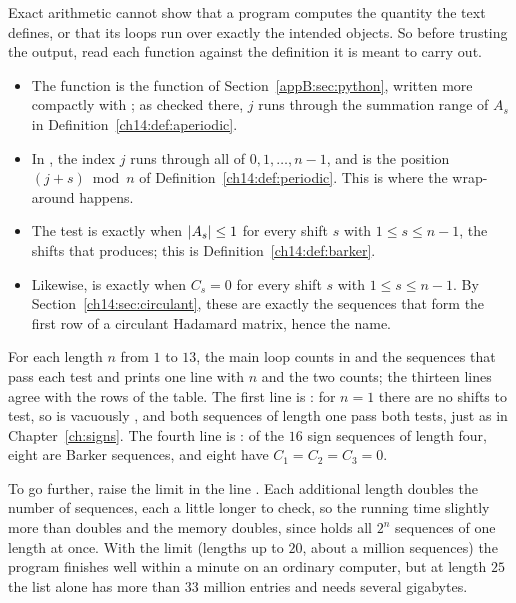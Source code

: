Exact arithmetic cannot show that a program computes the quantity the text defines, or that its loops run over exactly the intended objects. So before trusting the output, read each function against the definition it is meant to carry out.
\begin{itemize}
\item The function  is the function  of Section~\ref{appB:sec:python}, written more compactly with ; as checked there, $j$ runs through the summation range of $A_s$ in Definition~\ref{ch14:def:aperiodic}.
\item In , the index $j$ runs through all of $0,1,\ldots,n-1$, and  is the position $(j+s)\bmod n$ of Definition~\ref{ch14:def:periodic}. This is where the wrap-around happens.
\item The test  is  exactly when $\left|A_s\right|\le1$ for every shift $s$ with $1\le s\le n-1$, the shifts that  produces; this is Definition~\ref{ch14:def:barker}.
\item Likewise,  is  exactly when $C_s=0$ for every shift $s$ with $1\le s\le n-1$. By Section~\ref{ch14:sec:circulant}, these are exactly the sequences that form the first row of a circulant Hadamard matrix, hence the name.
\end{itemize}
For each length $n$ from $1$ to $13$, the main loop counts in  and  the sequences that pass each test and prints one line with $n$ and the two counts; the thirteen lines agree with the rows of the table. The first line is : for $n=1$ there are no shifts to test, so  is vacuously , and both sequences of length one pass both tests, just as in Chapter~\ref{ch:signs}. The fourth line is : of the $16$ sign sequences of length four, eight are Barker sequences, and eight have $C_1=C_2=C_3=0$.

To go further, raise the limit  in the line . Each additional length doubles the number of sequences, each a little longer to check, so the running time slightly more than doubles and the memory doubles, since  holds all $2^n$ sequences of one length at once. With the limit  (lengths up to $20$, about a million sequences) the program finishes well within a minute on an ordinary computer, but at length $25$ the list alone has more than $33$ million entries and needs several gigabytes.

